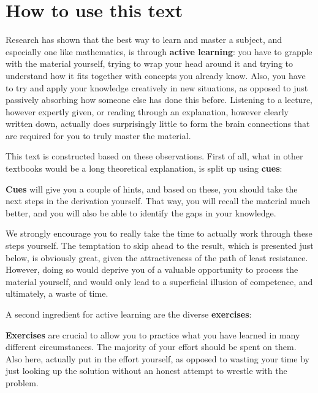 \chapter{How to use this text}

\newcommand{\iconoffset}{\raisebox{-.25\height}} 

Research has shown that the best way to learn and master a subject, and especially one like mathematics, is through \textbf{active learning}: you have to grapple with the material yourself, trying to wrap your head around it and trying to understand how it fits together with concepts you already know. Also, you have to try and apply your knowledge creatively in new situations, as opposed to just passively absorbing how someone else has done this before. Listening to a lecture, however expertly given, or reading through an explanation, however clearly written down, actually does surprisingly little to form the brain connections that are required for you to truly master the material.

This text is constructed based on these observations. First of all, what in other textbooks would be a long theoretical explanation, is split up using \textbf{cues}:

\begin{cue}
\textbf{Cues} will give you a couple of hints, and based on these, you should take the next steps in the derivation yourself. That way, you will recall the material much better, and you will also be able to identify the gaps in your knowledge.
\end{cue}

We strongly encourage you to really take the time to actually work through these steps yourself. The temptation to skip ahead to the result, which is presented just below, is obviously great, given the attractiveness of the path of least resistance. However, doing so would deprive you of a valuable opportunity to process the material yourself, and would only lead to a superficial illusion of competence, and ultimately, a waste of time.

A second ingredient for active learning are the diverse \textbf{exercises}:

\begin{exunmarked}
\textbf{Exercises} are crucial to allow you to practice what you have learned in many different circumstances. The majority of your effort should be spent on them. Also here, actually put in the effort yourself, as opposed to wasting your time by just looking up the solution without an honest attempt to wrestle with the problem.
\end{exunmarked}

